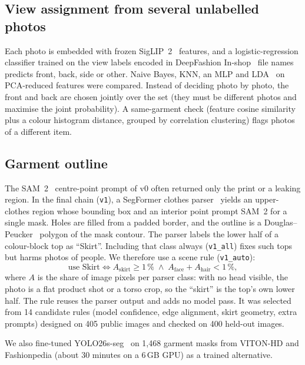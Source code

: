 \documentclass[conference]{IEEEtran}
\begin{document}
\subsection{View assignment from several unlabelled photos}
Each photo is embedded with frozen SigLIP~2~\cite{tschannen2025siglip2} features, and a logistic-regression classifier trained on the view labels encoded in DeepFashion In-shop~\cite{liu2016deepfashion} file names predicts front, back, side or other. Naive Bayes, KNN, an MLP and LDA~\cite{fisher1936lda} on PCA-reduced features were compared. Instead of deciding photo by photo, the front and back are chosen jointly over the set (they must be different photos and maximise the joint probability). A same-garment check (feature cosine similarity plus a colour histogram distance, grouped by correlation clustering) flags photos of a different item.

\subsection{Garment outline}
The SAM~2~\cite{ravi2024sam2} centre-point prompt of v0 often returned only the print or a leaking region. In the final chain (\texttt{v1}), a SegFormer clothes parser~\cite{xie2021segformer} yields an upper-clothes region whose bounding box and an interior point prompt SAM~2 for a single mask. Holes are filled from a padded border, and the outline is a Douglas--Peucker~\cite{douglas1973} polygon of the mask contour. The parser labels the lower half of a colour-block top as ``Skirt''. Including that class always (\texttt{v1\_all}) fixes such tops but harms photos of people. We therefore use a scene rule (\texttt{v1\_auto}):
\begin{equation}
\text{use Skirt} \iff A_{\text{skirt}} \geq 1\,\% \;\wedge\; A_{\text{face}} + A_{\text{hair}} < 1\,\%,
\end{equation}
where $A$ is the share of image pixels per parser class: with no head visible, the photo is a flat product shot or a torso crop, so the ``skirt'' is the top's own lower half. The rule reuses the parser output and adds no model pass. It was selected from 14 candidate rules (model confidence, edge alignment, skirt geometry, extra prompts) designed on 405 public images and checked on 400 held-out images.

We also fine-tuned YOLO26s-seg~\cite{ultralytics} on 1,468 garment masks from VITON-HD and Fashionpedia (about 30 minutes on a 6\,GB GPU) as a trained alternative.
\end{document}
